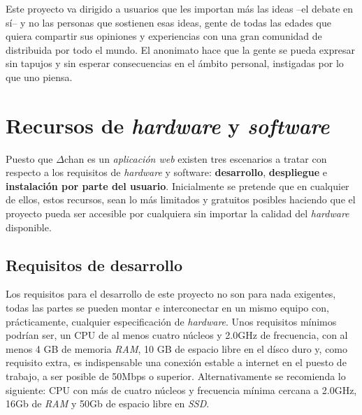 \documentclass[12pt,a4paper,titlepage]{article}
\newcommand\projectname{$\Delta$chan}
\begin{document}
    Este proyecto va dirigido a usuarios que les importan más las ideas --el debate en sí-- y no las personas que sostienen esas ideas, gente de todas las edades que quiera compartir sus opiniones y experiencias con una gran comunidad de distribuida por todo el mundo. El anonimato hace que la gente se pueda expresar sin tapujos y sin esperar consecuencias en el ámbito personal, instigadas por lo que uno piensa.

    \section{Recursos de \textit{hardware} y \textit{software}}




    Puesto que {\projectname} es un \emph{aplicación web} existen tres escenarios a tratar con respecto a los requisitos de \textit{hardware} y software: \textbf{desarrollo}, \textbf{despliegue} e \textbf{instalación por parte del usuario}. Inicialmente se pretende que en cualquier de ellos, estos recursos, sean lo más limitados y gratuitos posibles haciendo que el proyecto pueda ser accesible por cualquiera sin importar la calidad del \textit{hardware} disponible.

    \subsection{Requisitos de desarrollo}

    Los requisitos para el desarrollo de este proyecto no son para nada exigentes, todas las partes se pueden montar e interconectar en un mismo equipo con, prácticamente, cualquier especificación de \textit{hardware}. Unos requisitos mínimos podrían ser, un CPU de al menos cuatro núcleos y 2.0GHz de frecuencia, con al menos 4 GB de memoria \textit{RAM}, 10 GB de espacio libre en el dísco duro y, como requisito extra, es indispensable una conexión estable a internet en el puesto de trabajo, a ser posible de 50Mbps o superior. Alternativamente se recomienda lo siguiente: CPU con más de cuatro núcleos y frecuencia mínima cercana a 2.0GHz, 16Gb de \textit{RAM} y 50Gb de espacio libre en \textit{SSD}.
\end{document}
